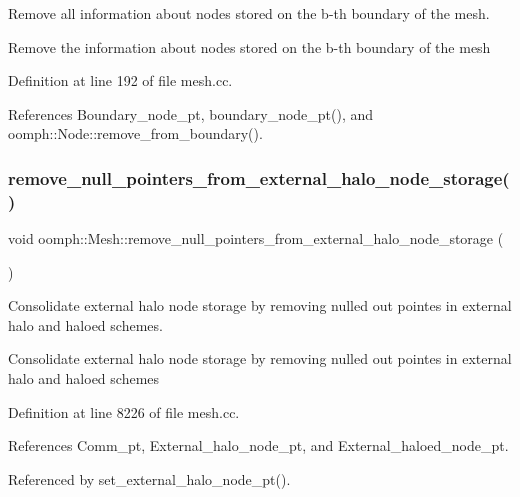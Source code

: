 Remove all information about nodes stored on the b-\/th boundary of the mesh. 

Remove the information about nodes stored on the b-\/th boundary of the mesh 

Definition at line 192 of file mesh.\+cc.



References Boundary\+\_\+node\+\_\+pt, boundary\+\_\+node\+\_\+pt(), and oomph\+::\+Node\+::remove\+\_\+from\+\_\+boundary().

\mbox{\label{classoomph_1_1Mesh_aee3e4769c2025c603a6eb90bed08fb9a}} 
\subsubsection{\texorpdfstring{remove\+\_\+null\+\_\+pointers\+\_\+from\+\_\+external\+\_\+halo\+\_\+node\+\_\+storage()}{remove\_null\_pointers\_from\_external\_halo\_node\_storage()}}
{\footnotesize\ttfamily void oomph\+::\+Mesh\+::remove\+\_\+null\+\_\+pointers\+\_\+from\+\_\+external\+\_\+halo\+\_\+node\+\_\+storage (\begin{DoxyParamCaption}{ }\end{DoxyParamCaption})}



Consolidate external halo node storage by removing nulled out pointes in external halo and haloed schemes. 

Consolidate external halo node storage by removing nulled out pointes in external halo and haloed schemes 

Definition at line 8226 of file mesh.\+cc.



References Comm\+\_\+pt, External\+\_\+halo\+\_\+node\+\_\+pt, and External\+\_\+haloed\+\_\+node\+\_\+pt.



Referenced by set\+\_\+external\+\_\+halo\+\_\+node\+\_\+pt().

\mbox{\label{classoomph_1_1Mesh_a801e77424d1bf8a35c9bba055230f1e3}} 
